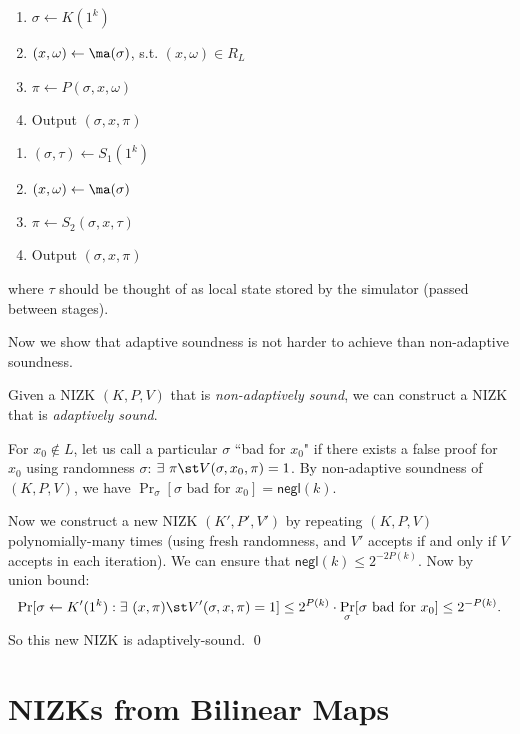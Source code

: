 \medskip
\begin{minipage}{0.5\textwidth}
    \begin{enumerate}[itemsep=0pt]
        \item $\sigma \gets K(1^k)$
        \item $(x, \omega) \gets \ma(\sigma)$, s.t. $(x, \omega) \in R_L$
        \item $\pi \gets P(\sigma, x, \omega)$
        \item Output $(\sigma, x, \pi)$
    \end{enumerate}
\end{minipage}
\begin{minipage}{0.5\textwidth}
    \begin{enumerate}[itemsep=0pt]
        \item $(\sigma, \tau) \gets S_1(1^k)$
        \item $(x, \omega) \gets \ma(\sigma)$
        \item $\pi \gets S_2(\sigma, x, \tau)$
        \item Output $(\sigma, x, \pi)$
    \end{enumerate}
\end{minipage}

\medskip
\noindent where $\tau$ should be thought of as local state stored by the simulator (passed
    between stages).

\bigskip
Now we show that adaptive soundness is not harder to achieve than non-adaptive soundness.
\begin{theorem}\label{thm:amplify-soundness}
    Given a NIZK $(K, P, V)$ that is \emph{non-adaptively sound}, we can
    construct a NIZK that is \emph{adaptively sound}.
\end{theorem}
\proof
For $x_0 \not\in L$, let us call a particular $\sigma$ ``bad for $x_0$" if 
there exists a false proof for $x_0$ using randomness $\sigma$:
$\exists~ \pi \st V(\sigma, x_0, \pi) = 1$.
By non-adaptive soundness of $(K, P, V)$, we have
$\Pr_\sigma[\sigma \text{ bad for } x_0] = \mathsf{negl}(k)$.

Now we construct a new NIZK $(K',P',V')$ by repeating $(K,P,V)$ polynomially-many times
(using fresh randomness, and $V'$ accepts if and only if $V$ accepts in each iteration).
We can ensure that $\mathsf{negl}(k) \leq 2^{-2P(k)}$.
Now by  union bound:
$$
\Pr[\sigma \gets K'(1^k): \exists~ (x, \pi) \st V'(\sigma, x, \pi) = 1] \leq
2^{P(k)}\cdot \Pr_\sigma[\sigma \text{ bad for } x_0] \leq 2^{-P(k)}.$$
So this new NIZK is adaptively-sound. \qed

\section{NIZKs from Bilinear Maps}


